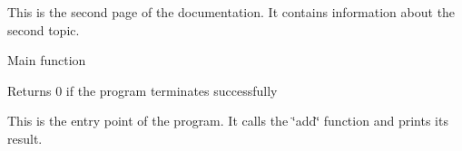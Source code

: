 This is the second page of the documentation. It contains information about the second topic.

Main function

\begin{DoxyReturn}{Returns}
0 if the program terminates successfully
\end{DoxyReturn}
This is the entry point of the program. It calls the \char`\"{}add\char`\"{} function and prints its result. 